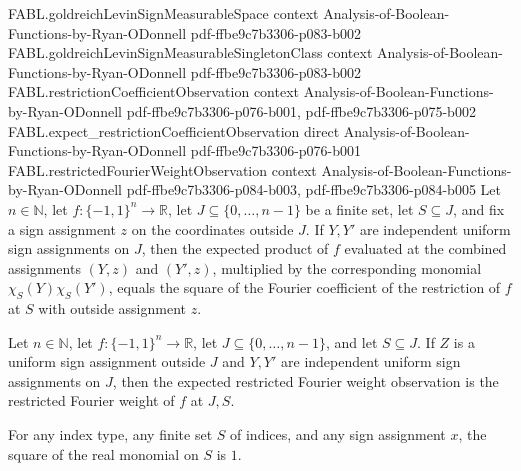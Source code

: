 \begin{theorem}
\proofstep
  {FABL.goldreichLevinSignMeasurableSpace}
  {context}
  {Analysis-of-Boolean-Functions-by-Ryan-ODonnell}
  {pdf-ffbe9c7b3306-p083-b002}
\proofstep
  {FABL.goldreichLevinSignMeasurableSingletonClass}
  {context}
  {Analysis-of-Boolean-Functions-by-Ryan-ODonnell}
  {pdf-ffbe9c7b3306-p083-b002}
\proofstep
  {FABL.restrictionCoefficientObservation}
  {context}
  {Analysis-of-Boolean-Functions-by-Ryan-ODonnell}
  {pdf-ffbe9c7b3306-p076-b001,
    pdf-ffbe9c7b3306-p075-b002}
\proofstep
  {FABL.expect_restrictionCoefficientObservation}
  {direct}
  {Analysis-of-Boolean-Functions-by-Ryan-ODonnell}
  {pdf-ffbe9c7b3306-p076-b001}
\proofstep
  {FABL.restrictedFourierWeightObservation}
  {context}
  {Analysis-of-Boolean-Functions-by-Ryan-ODonnell}
  {pdf-ffbe9c7b3306-p084-b003,
    pdf-ffbe9c7b3306-p084-b005}
Let $n\in\mathbb N$, let $f:\{−1,1\}^n\to\mathbb R$, let $J\subseteq\{0,\ldots,n-1\}$ be
a finite set, let $S\subseteq J$, and fix a sign assignment $z$ on the coordinates
outside $J$. If $Y,Y'$ are independent uniform sign assignments on $J$, then the
expected product of $f$ evaluated at the combined assignments $(Y,z)$ and $(Y',z)$,
multiplied by the corresponding monomial $\chi_S(Y)\chi_S(Y')$, equals the square of the
Fourier coefficient of the restriction of $f$ at $S$ with outside assignment $z$.
\end{theorem}

\begin{theorem}
\label{FABL.expect_restrictedFourierWeightObservation_eq_restrictedFourierWeight}
\leanok
{}
Let $n\in\mathbb N$, let $f:\{−1,1\}^n\to\mathbb R$, let $J\subseteq\{0,\ldots,n-1\}$,
and let $S\subseteq J$. If $Z$ is a uniform sign assignment outside $J$ and $Y,Y'$ are
independent uniform sign assignments on $J$, then the expected restricted Fourier weight
observation is the restricted Fourier weight of $f$ at $J,S$.
\end{theorem}

\begin{theorem}
\label{FABL.indexedMonomial_sq}
\leanok
{}
For any index type, any finite set $S$ of indices, and any sign assignment $x$, the
square of the real monomial on $S$ is $1$.
\end{theorem}

